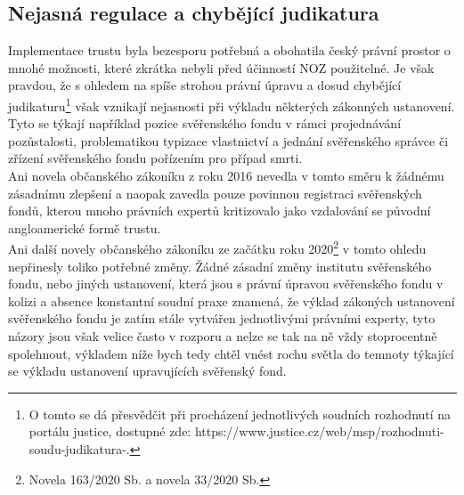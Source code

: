 \documentclass{article}
\begin{document}



\subsection{Nejasná regulace a chybějící judikatura}

Implementace trustu byla bezesporu potřebná a obohatila český právní prostor o mnohé možnosti, které zkrátka nebyli před účinností NOZ použitelné. Je však pravdou, že s ohledem na spíše strohou právní úpravu a dosud chybějící judikaturu\footnote{O tomto se dá přesvědčit při procházení jednotlivých soudních rozhodnutí na portálu justice, dostupné zde: https://www.justice.cz/web/msp/rozhodnuti-soudu-judikatura-.} však vznikají nejasnosti při výkladu některých zákonných ustanovení.\\

Tyto se týkají například pozice svěřenského fondu v rámci projednávání pozůstalosti, problematikou typizace vlastnictví a jednání svěřenského správce či zřízení svěřenského fondu pořízením pro případ smrti.\\

Ani novela občanského zákoníku z roku 2016 nevedla v tomto směru k žádnému zásadnímu zlepšení a naopak zavedla pouze povinnou registraci svěřenských fondů, kterou mnoho právních expertů kritizovalo jako vzdalování se původní angloamerické formě trustu.\\

Ani další novely občanského zákoníku ze začátku roku 2020\footnote{Novela 163/2020 Sb. a novela 33/2020 Sb.} v tomto ohledu nepřinesly toliko potřebné změny. Žádné zásadní změny institutu svěřenského fondu, nebo jiných ustanovení, která jsou s právní úpravou svěřenského fondu v kolizi a absence konstantní soudní praxe znamená, že výklad zákoných ustanovení svěřenského fondu je zatím stále vytvářen jednotlivými právními experty, tyto názory jsou však velice často v rozporu a nelze se tak na ně vždy stoprocentně spolehnout, výkladem níže bych tedy chtěl vnést rochu světla do temnoty týkající se výkladu ustanovení upravujících svěřenský fond.\\
\end{document}
